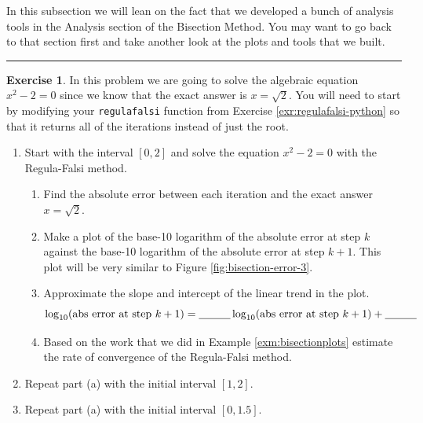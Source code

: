 \documentclass[
]{book}
\providecommand{\tightlist}{%
  \setlength{\itemsep}{0pt}\setlength{\parskip}{0pt}}
\theoremstyle{definition}
\theoremstyle{definition}
\theoremstyle{definition}
\newtheorem{exercise}{Exercise}[chapter]
\theoremstyle{remark}
\begin{document}
In this subsection we will lean on the fact that we developed a bunch of analysis tools in the Analysis section of the Bisection Method. You may want to go back to that section first and take another look at the plots and tools that we built.

\begin{center}\rule{0.5\linewidth}{0.5pt}\end{center}

\begin{exercise}
\protect\hypertarget{exr:unnamed-chunk-95}{}{\label{exr:unnamed-chunk-95} }In this problem we are going to solve the algebraic equation \(x^2 - 2 = 0\) since we know that the exact answer is \(x = \sqrt{2}\). You will need to start by modifying your \texttt{regulafalsi} function from Exercise \ref{exr:regulafalsi-python} so that it returns all of the iterations instead of just the root.

\begin{enumerate}
\def\labelenumi{\alph{enumi}.}
\tightlist
\item
  Start with the interval \([0,2]\) and solve the equation \(x^2 - 2 = 0\) with the Regula-Falsi method.

  \begin{enumerate}
  \def\labelenumii{\roman{enumii}.}
  \tightlist
  \item
    Find the absolute error between each iteration and the exact answer \(x=\sqrt{2}\).
  \item
    Make a plot of the base-10 logarithm of the absolute error at step \(k\) against the base-10 logarithm of the absolute error at step \(k+1\). This plot will be very similar to Figure \ref{fig:bisection-error-3}.
  \item
    Approximate the slope and intercept of the linear trend in the plot.
    \[ \log_{10}(\text{abs error at step $k+1$}) = \underline{\hspace{0.4in}} \log_{10}(\text{abs error at step $k+1$}) + \underline{\hspace{0.4in}} \]
  \item
    Based on the work that we did in Example \ref{exm:bisectionplots} estimate the rate of convergence of the Regula-Falsi method.
  \end{enumerate}
\item
  Repeat part (a) with the initial interval \([1,2]\).
\item
  Repeat part (a) with the initial interval \([0,1.5]\).
\end{enumerate}
\end{exercise}
\end{document}
